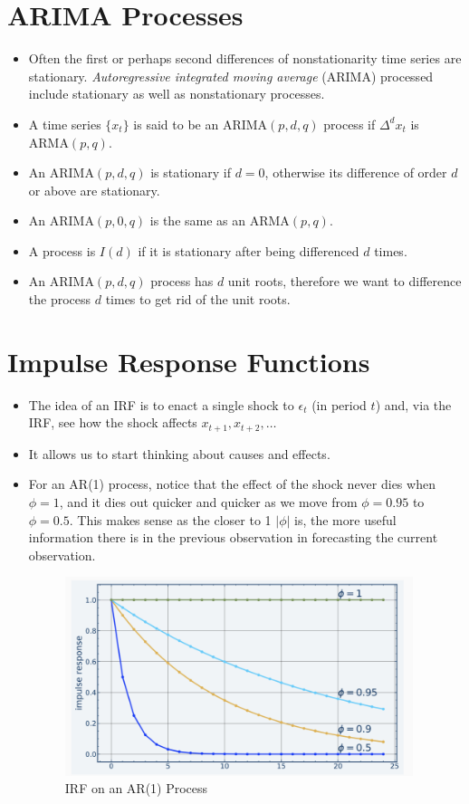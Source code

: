 \documentclass[11pt]{article}
\begin{document}
\section{ARIMA Processes}
\begin{itemize}
    \item Often the first or perhaps second differences of nonstationarity time series are 
    stationary. \textit{Autoregressive integrated moving average} (ARIMA) processed include 
    stationary as well as nonstationary processes.
    \item A time series $\{x_t\}$ is said to be an $\text{ARIMA}(p,d,q)$ process if $\Delta^d 
    x_t$ is $\text{ARMA}(p,q)$.
    \item An $\text{ARIMA}(p,d,q)$ is stationary if $d=0$, otherwise its difference of order 
    $d$ or above are stationary. 
    \item An $\text{ARIMA}(p,0,q)$ is the same as an $\text{ARMA}(p,q)$.
    \item A process is $I(d)$ if it is stationary after being differenced $d$ times.
    \item An $\text{ARIMA}(p,d,q)$ process has $d$ unit roots, therefore we want to difference 
    the process $d$ times to get rid of the unit roots. 
\end{itemize}

\section{Impulse Response Functions}
\begin{itemize}
    \item The idea of an IRF is to enact a single shock to $\epsilon_t$ (in period $t$) and,
    via the IRF, see how the shock affects $x_{t+1}, x_{t+2}, \ldots$
    \item It allows us to start thinking about causes and effects.
    \item For an AR(1) process, notice that the effect of the shock never dies when $\phi=1$,
    and it dies out quicker and quicker as we move from $\phi=0.95$ to $\phi=0.5$. This makes 
    sense as the closer to 1 $|\phi|$ is, the more useful information there is in the previous 
    observation in forecasting the current observation.
    \begin{figure}[H] 
        \centering 
        \includegraphics[width=4in]{imgs/irf.png}
        \caption{IRF on an AR(1) Process}
    \end{figure}
\end{itemize}
\end{document}
